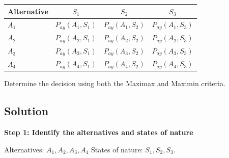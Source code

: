 			\begin{center}
			\renewcommand{\arraystretch}{1.3}
			\begin{tabular}{lccc}
			\toprule
			Alternative & $S_1$ & $S_2$ & $S_3$ \\
			\midrule
			
			$A_1$
			& $P_{ay}(A_1,S_1)$
			& $P_{ay}(A_1,S_2)$
			& $P_{ay}(A_1,S_3)$
			\\
			
			$A_2$
			& $P_{ay}(A_2,S_1)$
			& $P_{ay}(A_2,S_2)$
			& $P_{ay}(A_2,S_3)$
			\\
			
			$A_3$
			& $P_{ay}(A_3,S_1)$
			& $P_{ay}(A_3,S_2)$
			& $P_{ay}(A_3,S_3)$
			\\
			
			$A_4$
			& $P_{ay}(A_4,S_1)$
			& $P_{ay}(A_4,S_2)$
			& $P_{ay}(A_4,S_3)$
		\\
	
	\bottomrule
	\end{tabular}
	\end{center}
	
	Determine the decision using both the Maximax and Maximin criteria.
	
	
	\subsection{Solution}
	
	\textbf{Step 1: Identify the alternatives and states of nature}
	
	Alternatives: $A_1, A_2, A_3, A_4$
	\qquad
	States of nature: $S_1, S_2, S_3$.
	
	\noindent
		\setlength{\columnseprule}{0.4pt}
		
